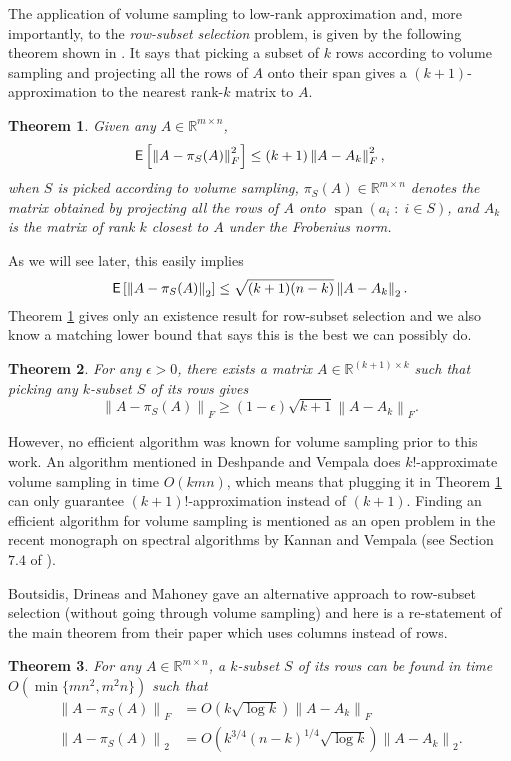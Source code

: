 \documentclass[11pt]{article}
\newtheorem{theorem}{Theorem}
\def\reals{\mathbb{R}}
\def\eps{\epsilon}
\def\suchthat{\;:\;}
\newcommand{\linspan}[1]{\operatorname{span}\left(#1\right)}
\newcommand{\norm}[1]{\left\|#1\right\|}
\newcommand{\frob}[1]{\left\|#1\right\|_{F}}
\newcommand{\expec}[1]{{\sf E} \left[#1\right]}
\begin{document}
The application of volume sampling to low-rank approximation and, more importantly, to the \emph{row-subset selection} problem, is given by the following theorem shown in \cite{DRVW}. It says that picking a subset of $k$ rows according to volume sampling and projecting all the rows of $A$ onto their span gives a $(k+1)$-approximation to the nearest rank-$k$ matrix to $A$.
\begin{theorem} \cite{DRVW} \label{thm:vol-sampling}
Given any $A \in \reals^{m \times n}$,
\[
\expec{\frob{A - \pi_{S}(A)}^{2}} \leq (k+1) \frob{A - A_{k}}^{2},
\]
when $S$ is picked according to volume sampling, $\pi_{S}(A) \in \reals^{m \times n}$ denotes the matrix obtained by projecting all the rows of $A$ onto $\linspan{a_{i} \suchthat i \in S}$, and $A_{k}$ is the matrix of rank $k$ closest to $A$ under the Frobenius norm.
\end{theorem}
As we will see later, this easily implies
\[
\expec{\norm{A - \pi_{S}(A)}_{2}} \leq \sqrt{(k+1)(n-k)} \norm{A - A_{k}}_{2}.
\]
Theorem \ref{thm:vol-sampling} gives only an existence result for row-subset selection and we also know a matching lower bound that says this is the best we can possibly do.
\begin{theorem} \cite{DRVW} \label{thm:DRVW-lower}
For any $\eps > 0$, there exists a matrix $A \in \reals^{(k+1) \times k}$ such that picking any $k$-subset $S$ of its rows gives
\[
\frob{A - \pi_{S}(A)} \geq (1-\eps) \sqrt{k+1} \frob{A - A_{k}}.
\]
\end{theorem}

However, no efficient algorithm was known for volume sampling prior to this work. An algorithm mentioned in Deshpande and Vempala \cite{DV} does $k!$-approximate volume sampling in time $O(kmn)$, which means that plugging it in Theorem \ref{thm:vol-sampling} can only guarantee $(k+1)!$-approximation instead of $(k+1)$. Finding an efficient algorithm for volume sampling is mentioned as an open problem in the recent monograph on spectral algorithms by Kannan and Vempala (see Section $7.4$ of \cite{KV}).

Boutsidis, Drineas and Mahoney \cite{BDM} gave an alternative approach to row-subset selection (without going through volume sampling) and here is a re-statement of the main theorem from their paper which uses columns instead of rows.


\begin{theorem} \cite{BDM} \label{thm:bdm-soda}
For any $A \in \reals^{m \times n}$, a $k$-subset $S$ of its rows can be found in time $O\left(\min\{mn^{2}, m^{2}n\}\right)$ such that
\begin{align*}
\frob{A - \pi_{S}(A)} & = O(k \sqrt{\log k}) \frob{A - A_{k}} \\
\norm{A - \pi_{S}(A)}_{2} & = O\left(k^{3/4} (n-k)^{1/4} \sqrt{\log k}\right) \norm{A - A_{k}}_{2}.
\end{align*}
\end{theorem}
\end{document}
